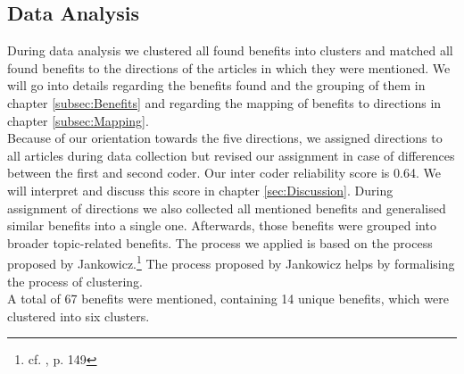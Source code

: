 \subsection{Data Analysis}
During data analysis we clustered all found benefits into clusters and matched all found benefits to the directions of the articles in which they were mentioned. We will go into details regarding the benefits found and the grouping of them in chapter \ref{subsec:Benefits} and regarding the mapping of benefits to directions in chapter \ref{subsec:Mapping}.\\
Because of our orientation towards the five directions, we assigned directions to all articles during data collection but revised our assignment in case of differences between the first and second coder. Our inter coder reliability score is 0.64. We will interpret and discuss this score in chapter \ref{sec:Discussion}. During assignment of directions we also collected all mentioned benefits and generalised similar benefits into a single one. Afterwards, those benefits were grouped into broader topic-related benefits. The process we applied is based on the process proposed by Jankowicz.\footnote{cf. \cite{Jankowicz.2003}, p. 149} The process proposed by Jankowicz helps by formalising the process of clustering.\\
A total of 67 benefits were mentioned, containing 14 unique benefits, which were clustered into six clusters.